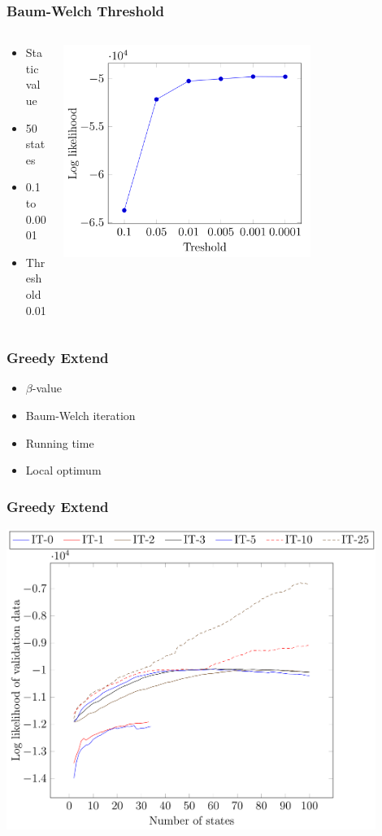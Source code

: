 \begin{frame}
	\frametitle{Baum-Welch Threshold}
	\begin{columns}[t]
		\begin{column}{3.3cm}
			\begin{itemize}
				\item Static value
				\item 50 states
				\item 0.1 to 0.0001
				\item Threshold 0.01
			\end{itemize}
		\end{column}
		\begin{column}{12cm}
			\begin{flushleft}			\includegraphics[width=0.7\textwidth]{images/threshold.png}
			\end{flushleft}
		\end{column}
	\end{columns}
	
\end{frame}

\begin{frame}
	\frametitle{Greedy Extend}
	\begin{itemize}
		\item $\beta$-value
		\item Baum-Welch iteration
		\item Running time
		\item Local optimum
	\end{itemize}
\end{frame}

\begin{frame}
	\frametitle{Greedy Extend}
	\begin{centering}
		\includegraphics[width=0.9\textwidth]{images/beta.png}
	\end{centering}
\end{frame}
